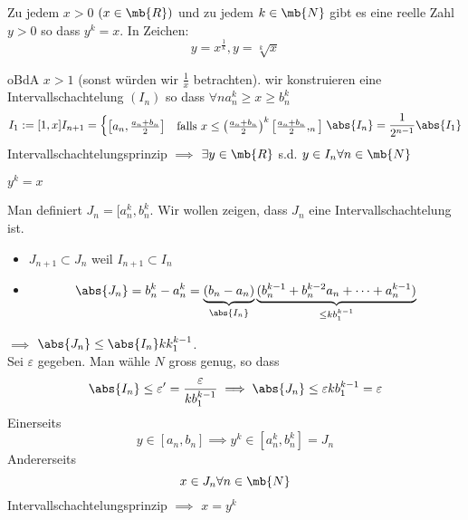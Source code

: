 \begin{Sat}
  Zu jedem $x>0$ $(x\in\mb{R})$ und zu jedem $k\in\mb{N}$ gibt es eine reelle Zahl $y>0$ so dass $y^k=x$. In Zeichen:
  \[y=x^\frac{1}{k}, y=\sqrt[k]{x}\]
\end{Sat}
\begin{Bew}
  oBdA $x>1$ (sonst würden wir $\frac{1}{x}$ betrachten). wir konstruieren eine Intervallschachtelung $(I_n)$ so dass $\forall n a_n^k \geq x \geq b_n^k$
  \begin{equation*}
    I_1:=[1,x]\\
    I_{n+1} = \begin{cases}
      \left[ a_n, \frac{a_n+b_n}{2} \right] & \text{falls } x \leq \left( \frac{a_n+b_n}{2} \right)^k
      \left[ \frac{a_n+b_n}{2}, _n \right]
    \end{cases}\\
    \abs{I_n} = \frac{1}{2^{n-1}}\abs{I_1}
  \end{equation*}
  Intervallschachtelungsprinzip $\implies$ $\exists y\in\mb{R}$ s.d. $y\in I_n \forall n\in\mb{N}$ 
\end{Bew}
\begin{Beh}
  $y^k=x$
\end{Beh}
\begin{Bew}
   Man definiert $J_n=[a_n^k, b_n^k$. Wir wollen zeigen, dass $J_n$ eine Intervallschachtelung ist.
  \begin{itemize}
    \item $J_{n+1}\subset J_n$ weil $I_{n+1}\subset I_n$
    \item \[\abs{J_n} = b_n^k-a_n^k = \underbrace{\left( b_n - a_n \right)}_{\abs{I_n}} \underbrace{(b_n^{k-1}+b_n^{k-2}a_n + \cdots + a_n^{k-1})}_{\leq k b_1^{k-1}}\]
  \end{itemize}
  $\implies$ $\abs{J_n}\leq \abs{I_n}k k_1^{k-1}$.\\
  Sei $\varepsilon$ gegeben. Man wähle $N$ gross genug, so dass
  \[\abs{I_n}\leq\varepsilon'=\frac{\varepsilon}{kb_1^{k-1}}\implies\abs{J_n}\leq \varepsilon kb_1^{k-1}=\varepsilon\]
  Einerseits
  \[y\in\left[ a_n,b_n \right]\implies y^k\in\left[ a_n^k, b_n^k \right]=J_n\]
  Andererseits
  \[x\in J_n\forall n\in\mb{N}\]
  Intervallschachtelungsprinzip $\implies$ $x=y^k$
\end{Bew}
